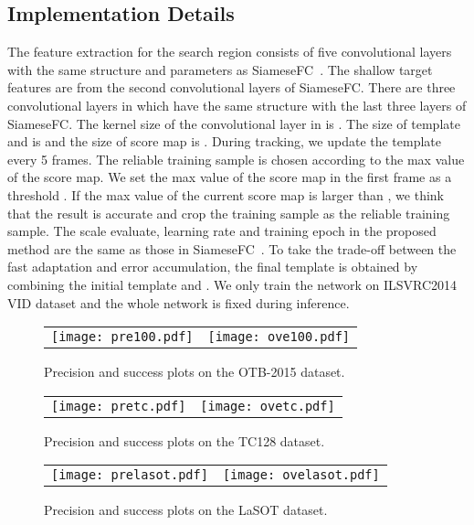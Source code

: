 \documentclass[10pt,twocolumn,letterpaper]{article}
\begin{document}
\subsection{Implementation Details}\label{sec::detail}
The feature extraction  for the search region consists of five convolutional layers with the same structure and parameters as SiameseFC~\cite{Bertinetto-ECCV16-SiamesFC}.
The shallow target features  are from the second convolutional layers of SiameseFC.
There are three convolutional layers in  which have the same structure with the last three layers of SiameseFC.
The kernel size of the convolutional layer in  is .
The size of template  and  is  and the size of score map is .
During tracking, we update the template  every 5 frames.
The reliable training sample is chosen according to the max value of the score map. We set the max value of the score map in the first frame as a threshold . If the max value of the current score map is larger than , we think that the result is accurate and crop the training sample  as the reliable training sample.
The scale evaluate, learning rate and training epoch in the proposed method are the same as those in SiameseFC~\cite{Bertinetto-ECCV16-SiamesFC}.
To take the trade-off between the fast adaptation and error accumulation, the final template is obtained by combining the initial template and .
We only train the network on ILSVRC2014 VID dataset and the whole network is fixed during inference.

\begin{figure}[t]
	\centering
	\begin{tabular}{c@{}c}
		\texttt{[image: pre100.pdf]}  &
		\texttt{[image: ove100.pdf]} \\
	\end{tabular}
	\caption{Precision and success plots on the OTB-2015 dataset.}
	\label{fig-otb}
\end{figure}
\begin{figure}[t]
	\centering
	\begin{tabular}{c@{}c}
		\texttt{[image: pretc.pdf]}    &
		\texttt{[image: ovetc.pdf]}   \\
	\end{tabular}
	\caption{Precision and success plots on the TC128 dataset.}
	\label{fig-tc128}
\end{figure}
\begin{figure}[t]
	\centering
	\begin{tabular}{c@{}c}
		\texttt{[image: prelasot.pdf]}    &
		\texttt{[image: ovelasot.pdf]}   \\
	\end{tabular}
	\caption{Precision and success plots on the LaSOT dataset.}
	\label{fig-lasot}
\end{figure}
\end{document}

